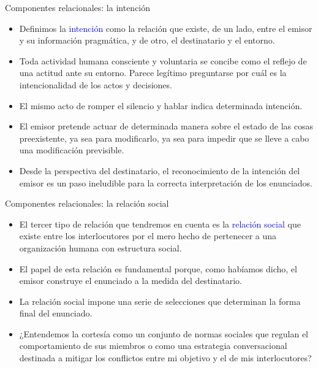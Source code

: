 \documentclass{beamer}
\begin{document}
\begin{frame}{Componentes relacionales: la intención}

\begin{itemize}
	\item Definimos la \textcolor{blue}{intención} como la relación que existe, de un lado, entre el emisor y su información pragmática, y de otro, el destinatario y el entorno. 
	\item Toda actividad humana consciente y voluntaria se concibe como el reflejo de una actitud ante su entorno. Parece legítimo preguntarse por cuál es la intencionalidad de los actos y decisiones.
	\item El mismo acto de romper el silencio y hablar indica determinada intención. 
	\item El emisor pretende actuar de determinada manera sobre el estado de las cosas preexistente, ya sea para modificarlo, ya sea para impedir que se lleve a cabo una modificación previsible.
	\item Desde la perspectiva del destinatario, el reconocimiento de la intención del emisor es un paso ineludible para la correcta interpretación de los enunciados. 
\end{itemize}

\end{frame}


\begin{frame}{Componentes relacionales: la relación social}

\begin{itemize}
	\item El tercer tipo de relación que tendremos en cuenta es la \textcolor{blue}{relación social} que existe entre los interlocutores por el mero hecho de pertenecer a una organización humana con estructura social.
	\item El papel de esta relación es fundamental porque, como habíamos dicho, el emisor construye el enunciado a la medida del destinatario.
	\item La relación social impone una serie de selecciones que determinan la forma final del enunciado.
	\item ¿Entendemos la cortesía como un conjunto de normas sociales que regulan el comportamiento de sus miembros o como una estrategia conversacional destinada a mitigar los conflictos entre mi objetivo y el de mis interlocutores?
\end{itemize}

\end{frame}
\end{document}
